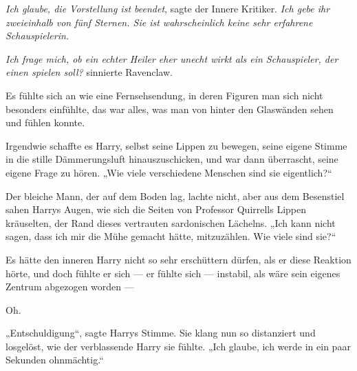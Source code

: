 \emph{Ich glaube, die Vorstellung ist beendet}, sagte der Innere Kritiker. \emph{Ich gebe ihr zweieinhalb von fünf Sternen. Sie ist wahrscheinlich keine sehr erfahrene Schauspielerin.}

\emph{Ich frage mich, ob ein echter Heiler eher unecht wirkt als ein Schauspieler, der einen spielen soll?} sinnierte Ravenclaw.

Es fühlte sich an wie eine Fernsehsendung, in deren Figuren man sich nicht besonders einfühlte, das war alles, was man von hinter den Glaswänden sehen und fühlen konnte.

Irgendwie schaffte es Harry, selbst seine Lippen zu bewegen, seine eigene Stimme in die stille Dämmerungsluft hinauszuschicken, und war dann überrascht, seine eigene Frage zu hören.
„Wie viele verschiedene Menschen sind sie eigentlich?“

Der bleiche Mann, der auf dem Boden lag, lachte nicht, aber aus dem Besenstiel sahen Harrys Augen, wie sich die Seiten von Professor Quirrells Lippen kräuselten, der Rand dieses vertrauten sardonischen Lächelns.
„Ich kann nicht sagen, dass ich mir die Mühe gemacht hätte, mitzuzählen. Wie viele sind sie?“

Es hätte den inneren Harry nicht so sehr erschüttern dürfen, als er diese Reaktion hörte, und doch fühlte er sich — er fühlte sich — instabil, als wäre sein eigenes Zentrum abgezogen worden —

Oh.

„Entschuldigung“, sagte Harrys Stimme. Sie klang nun so distanziert und losgelöst, wie der verblassende Harry sie fühlte.
„Ich glaube, ich werde in ein paar Sekunden ohnmächtig.“

